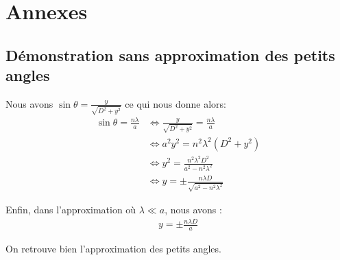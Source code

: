 \documentclass[12pt]{article}
\begin{document}
\newpage

\section*{Annexes}
\subsection{Démonstration sans approximation des petits angles}
Nous avons $\sin \theta = \frac{y}{\sqrt{D^2+y^2}}$ ce qui nous donne alors:
\begin{align*}
    \sin \theta = \frac{n\lambda}{a} & \Leftrightarrow \frac{y}{\sqrt{D^2+y^2}} = \frac{n\lambda}{a} \\
    & \Leftrightarrow a^2y^2 = n^2 \lambda ^2 \left( D^2 + y^2 \right) \\
    & \Leftrightarrow y^2 = \frac{n^2 \lambda^2 D^2}{a^2 - n^2 \lambda^2} \\
    & \Leftrightarrow y = \pm \frac{n \lambda D}{\sqrt{a^2 - n^2 \lambda^2}}
\end{align*}

Enfin, dans l'approximation où $\lambda \ll a$, nous avons :
\begin{align}
    y = \pm \frac{n \lambda D}{a}
\end{align}

On retrouve bien l'approximation des petits angles.
\end{document}
